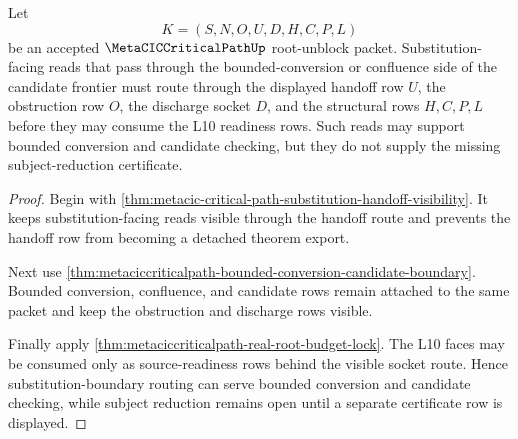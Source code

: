 \begin{theorem}
\label{thm:metaciccriticalpath-substitution-boundary-routing}
Let
$$
K=(S,N,O,U,D,H,C,P,L)
$$
be an accepted $\MetaCICCriticalPathUp$ root-unblock packet. Substitution-facing reads that pass through the bounded-conversion or confluence side of the candidate frontier must route through the displayed handoff row $U$, the obstruction row $O$, the discharge socket $D$, and the structural rows $H,C,P,L$ before they may consume the L10 readiness rows. Such reads may support bounded conversion and candidate checking, but they do not supply the missing subject-reduction certificate.
\end{theorem}
\begin{proof}
Begin with \autoref{thm:metacic-critical-path-substitution-handoff-visibility}. It keeps substitution-facing reads visible through the handoff route and prevents the handoff row from becoming a detached theorem export.

Next use \autoref{thm:metaciccriticalpath-bounded-conversion-candidate-boundary}. Bounded conversion, confluence, and candidate rows remain attached to the same packet and keep the obstruction and discharge rows visible.

Finally apply \autoref{thm:metaciccriticalpath-real-root-budget-lock}. The L10 faces may be consumed only as source-readiness rows behind the visible socket route. Hence substitution-boundary routing can serve bounded conversion and candidate checking, while subject reduction remains open until a separate certificate row is displayed.
\end{proof}

